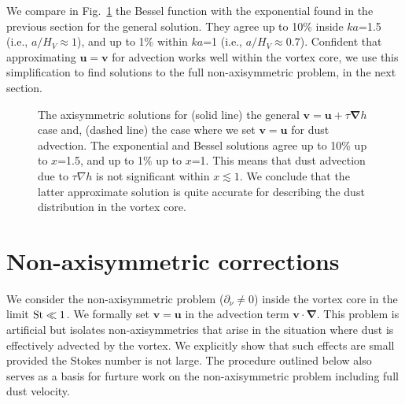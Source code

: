 \documentclass[apj]{emulateapj}
\renewcommand{\v}[1]{{\boldsymbol{#1}}} %
\newcommand{\del}{\v{\nabla}}
\newcommand{\grad}{\del}
\newcommand{\Eq}[1]{Eq. (\ref{#1})}
\newcommand{\eq}[1]{\Eq{#1}}
\newcommand{\Fig}[1]{Fig.~\ref{#1}}
\newcommand{\fig}[1]{\Fig{#1}}
\begin{document}
We compare in \fig{fig:bessel-gaussian} the Bessel function with the exponential found in the
previous section for the general solution. They agree up to 10\% inside
$ka$=1.5 (i.e., $a/H_V\approx 1$), and up to 1\% within $ka$=1 (i.e.,
$a/H_V\approx 0.7$). Confident that approximating $\v{u}=\v{v}$ for
advection works well within the vortex core, we use this
simplification to find solutions to the full non-axisymmetric problem,
in the next section. 

\begin{figure}
  \begin{center}
  \end{center}
\caption[]{The axisymmetric solutions for (solid line) the general 
$\v{v}=\v{u}+\tau\grad{h}$ case and, (dashed line) the case where
  we set $\v{v}=\v{u}$ for dust advection. 
The exponential and Bessel solutions agree up to 10\% up to $x$=1.5, and up 
to 1\% up to $x$=1. This means that dust advection due to $\tau\nabla{h}$
is not significant within $x\lesssim1$. We conclude that the latter
approximate solution is quite accurate for describing the dust
distribution in the vortex core.} 
 \label{fig:bessel-gaussian}
\end{figure}


\section{Non-axisymmetric corrections}
We consider the non-axisymmetric problem ($\partial_\nu\neq0$) inside
the vortex core in the limit $\rm{St}\ll 1$. %
We formally set $\bm{v}=\bm{u}$ in the advection term
$\bm{v}\cdot\del$. This problem is artificial but isolates
non-axisymmetries that arise in the situation where dust is effectively 
advected by the vortex.  
We explicitly show that such
effects are small provided the Stokes number is not large. 
The procedure outlined below also serves as a
basis for furture work on the non-axisymmetric problem including full
dust velocity.  
\end{document}

